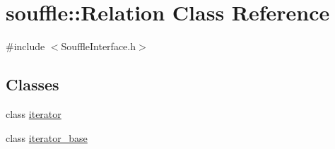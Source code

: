 \hypertarget{classsouffle_1_1_relation}{}\section{souffle\+:\+:Relation Class Reference}
\label{classsouffle_1_1_relation}


{\ttfamily \#include $<$Souffle\+Interface.\+h$>$}

\subsection*{Classes}
\begin{DoxyCompactItemize}
\item 
class \hyperlink{classsouffle_1_1_relation_1_1iterator}{iterator}
\item 
class \hyperlink{classsouffle_1_1_relation_1_1iterator__base}{iterator\+\_\+base}
\end{DoxyCompactItemize}

